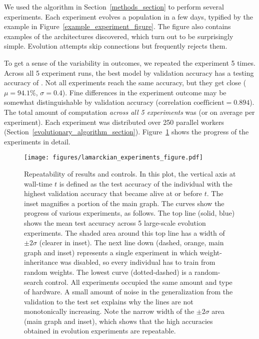 \documentclass{article}
\newcommand{\meanacc}{94.1}
\newcommand{\stddevacc}{0.4}
\newcommand{\meanflopsbase}{9}
\newcommand{\meanflopsexp}{19}
\newcommand{\bestacc}{94.6}
\newcommand{\totalflopsbase}{4}
\newcommand{\totalflopsexp}{20}
\begin{document}
We used the algorithm in Section~\ref{methods_section} to perform several experiments. Each experiment evolves a population in a few days, typified by the example in Figure~\ref{example_experiment_figure}. The figure also contains examples of the architectures discovered, which turn out to be surprisingly simple. Evolution attempts skip connections but frequently rejects them.

To get a sense of the variability in outcomes, we repeated the experiment 5 times. Across all 5 experiment runs, the best model by validation accuracy has a testing accuracy of \acc{\bestacc}. Not all experiments reach the same accuracy, but they get close ($\mu\!=\!\meanacc\%$, $\sigma\!=\!\stddevacc$). Fine differences in the experiment outcome may be somewhat distinguishable by validation accuracy ($\textrm{correlation coefficient}\!=\!0.894$). The total amount of computation {\em across all 5 experiments} was \flops{\totalflopsbase}{\totalflopsexp} (or \flops{\meanflopsbase}{\meanflopsexp} on average per experiment). Each experiment was distributed over 250 parallel workers (Section~\ref{evolutionary_algorithm_section}). Figure~\ref{lamarckian_experiments_figure} shows the progress of the experiments in detail.

\begin{figure}
    \vskip 0.2in
    \begin{centering}
        \centerline{\texttt{[image: figures/lamarckian\_experiments\_figure.pdf]}}
        \caption{Repeatability of results and controls. In this plot, the vertical axis at wall-time $t$ is defined as the test accuracy of the individual with the highest validation accuracy that became alive at or before $t$. The inset magnifies a portion of the main graph. The curves show the progress of various experiments, as follows. The top line (solid, blue) shows the mean test accuracy across 5 large-scale evolution experiments. The shaded area around this top line has a width of $\pm 2 \sigma$ (clearer in inset). The next line down (dashed, orange, main graph and inset) represents a single experiment in which weight-inheritance was disabled, so every individual has to train from random weights. The lowest curve (dotted-dashed) is a random-search control. All experiments occupied the same amount and type of hardware. A small amount of noise in the generalization from the validation to the test set explains why the lines are not monotonically increasing. Note the narrow width of the $\pm 2 \sigma$ area (main graph and inset), which shows that the high accuracies obtained in evolution experiments are repeatable.}
        \label{lamarckian_experiments_figure}
    \end{centering}
    \vskip 0.2in
\end{figure}
\end{document}
